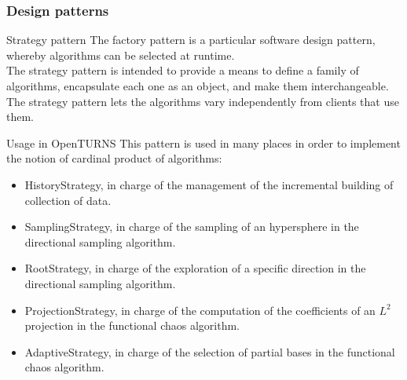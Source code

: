 \documentclass[8pt]{beamer}
\begin{document}
\begin{frame}
  \frametitle{Design patterns}
  \begin{block}{Strategy pattern}
    The \alert{factory pattern} is a particular software design pattern, whereby algorithms can be selected at runtime.\\
    The strategy pattern is intended to provide a means to define a family of algorithms, encapsulate each one as an object, and make them interchangeable. The strategy pattern lets the algorithms vary independently from clients that use them.
  \end{block}
  \begin{block}{Usage in OpenTURNS}
    This pattern is used in many places in order to implement the notion of cardinal product of algorithms:
    \begin{itemize}
    \item \alert{HistoryStrategy}, in charge of the management of the incremental building of collection of data.
    \item \alert{SamplingStrategy}, in charge of the sampling of an hypersphere in the directional sampling algorithm.
    \item \alert{RootStrategy}, in charge of the exploration of a specific direction in the directional sampling algorithm.
    \item \alert{ProjectionStrategy}, in charge of the computation of the coefficients of an $L^2$ projection in the functional chaos algorithm.
    \item \alert{AdaptiveStrategy}, in charge of the selection of partial bases in the functional chaos algorithm.
    \end{itemize}
  \end{block}
\end{frame}
\end{document}
